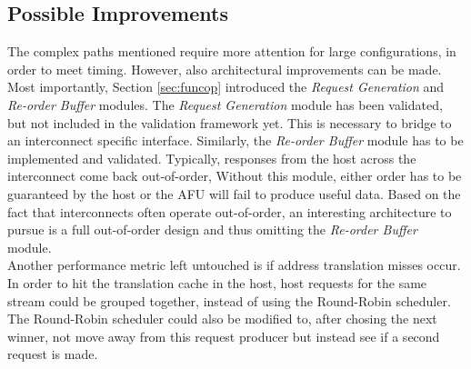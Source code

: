 \subsection{Possible Improvements}
The complex paths mentioned require more attention for large configurations, in order to meet timing. However, also architectural improvements can be made. Most importantly, Section \ref{sec:funcop} introduced the \textit{Request Generation} and \textit{Re-order Buffer} modules. The \textit{Request Generation} module has been validated, but not included in the validation framework yet. This is necessary to bridge to an interconnect specific interface. Similarly, the \textit{Re-order Buffer} module has to be implemented and validated. Typically, responses from the host across the interconnect come back out-of-order, Without this module, either order has to be guaranteed by the host or the AFU will fail to produce useful data. Based on the fact that interconnects often operate out-of-order, an interesting architecture to pursue is a full out-of-order design and thus omitting the \textit{Re-order Buffer} module.\\
Another performance metric left untouched is if address translation misses occur. In order to hit the translation cache in the host, host requests for the same stream could be grouped together, instead of using the Round-Robin scheduler. The Round-Robin scheduler could also be modified to, after chosing the next winner, not move away from this request producer but instead see if a second request is made.

